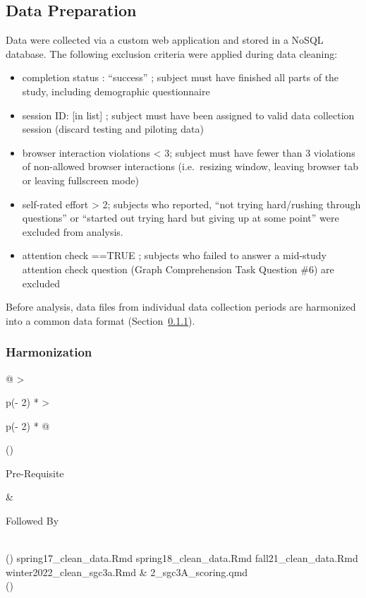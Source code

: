 \documentclass[
  letterpaper,
  DIV=11,
  numbers=noendperiod]{scrreprt}
\providecommand{\tightlist}{%
  \setlength{\itemsep}{0pt}\setlength{\parskip}{0pt}}\usepackage{longtable,booktabs,array}
\begin{document}
\hypertarget{data-preparation}{%
\subsection{Data Preparation}\label{data-preparation}}

Data were collected via a custom web application and stored in a NoSQL
database. The following exclusion criteria were applied during data
cleaning:

\begin{itemize}
\tightlist
\item
  completion status : ``success'' ; subject must have finished all parts
  of the study, including demographic questionnaire
\item
  session ID: {[}in list{]} ; subject must have been assigned to valid
  data collection session (discard testing and piloting data)
\item
  browser interaction violations \textless{} 3; subject must have fewer
  than 3 violations of non-allowed browser interactions (i.e.~resizing
  window, leaving browser tab or leaving fullscreen mode)
\item
  self-rated effort \textgreater{} 2; subjects who reported, ``not
  trying hard/rushing through questions'' or ``started out trying hard
  but giving up at some point'' were excluded from analysis.
\item
  attention check ==TRUE ; subjects who failed to answer a mid-study
  attention check question (Graph Comprehension Task Question \#6) are
  excluded
\end{itemize}

Before analysis, data files from individual data collection periods are
harmonized into a common data format
(Section~\ref{sec-SGC3A-harmonize}).

\hypertarget{sec-SGC3A-harmonize}{%
\subsubsection{Harmonization}\label{sec-SGC3A-harmonize}}

\begin{longtable}[]{@{}
  >{\raggedright\arraybackslash}p{(\columnwidth - 2\tabcolsep) * }
  >{\raggedright\arraybackslash}p{(\columnwidth - 2\tabcolsep) * }@{}}
\toprule()
\begin{minipage}[b]{\linewidth}\raggedright
Pre-Requisite
\end{minipage} & \begin{minipage}[b]{\linewidth}\raggedright
Followed By
\end{minipage} \\
\midrule()
\endhead
spring17\_clean\_data.Rmd spring18\_clean\_data.Rmd
fall21\_clean\_data.Rmd winter2022\_clean\_sgc3a.Rmd &
2\_sgc3A\_scoring.qmd \\
\bottomrule()
\end{longtable}
\end{document}
